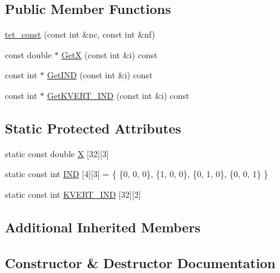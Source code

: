 \subsection*{Public Member Functions}
\begin{DoxyCompactItemize}
\item 
\mbox{\hyperlink{classfemus_1_1tet__const_ae375a9362478ba0d5b9e57dae7959462}{tet\+\_\+const}} (const int \&nc, const int \&nf)
\item 
const double $\ast$ \mbox{\hyperlink{classfemus_1_1tet__const_a12c7aec6a462159e1d191e189cdf6d07}{GetX}} (const int \&i) const
\item 
const int $\ast$ \mbox{\hyperlink{classfemus_1_1tet__const_aa52013fbedd8302be24a2622d45d92a8}{Get\+I\+ND}} (const int \&i) const
\item 
const int $\ast$ \mbox{\hyperlink{classfemus_1_1tet__const_a45c865d95f6a98e297d24d50893942b3}{Get\+K\+V\+E\+R\+T\+\_\+\+I\+ND}} (const int \&i) const
\end{DoxyCompactItemize}
\subsection*{Static Protected Attributes}
\begin{DoxyCompactItemize}
\item 
static const double \mbox{\hyperlink{classfemus_1_1tet__const_afde27b9828f3132102727969c8ab0315}{X}} \mbox{[}32\mbox{]}\mbox{[}3\mbox{]}
\item 
static const int \mbox{\hyperlink{classfemus_1_1tet__const_ae4029a014fd5191e491cfc458a24d444}{I\+ND}} \mbox{[}4\mbox{]}\mbox{[}3\mbox{]} = \{ \{0, 0, 0\}, \{1, 0, 0\}, \{0, 1, 0\}, \{0, 0, 1\} \}
\item 
static const int \mbox{\hyperlink{classfemus_1_1tet__const_ad896898295e61aa26b9bc13b79d87487}{K\+V\+E\+R\+T\+\_\+\+I\+ND}} \mbox{[}32\mbox{]}\mbox{[}2\mbox{]}
\end{DoxyCompactItemize}
\subsection*{Additional Inherited Members}


\subsection{Constructor \& Destructor Documentation}
\mbox{\label{classfemus_1_1tet__const_ae375a9362478ba0d5b9e57dae7959462}} 

